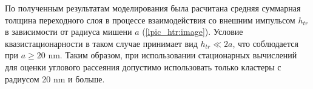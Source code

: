 

По полученным результатам моделирования была расчитана средняя суммарная толщина переходного слоя в процессе взаимодействия со внешним импульсом $h_{tr}$ в зависимости от радиуса мишени $a$ (\autoref{lpic_htr:image}). Условие квазистационарности в таком случае принимает вид $h_{tr} \ll 2a$, что соблюдается при $a \geq 20$ nm. Таким образом, при использовании стационарных вычислений для оценки углового рассеяния допустимо использовать только кластеры с радиусом 20 nm и больше.
